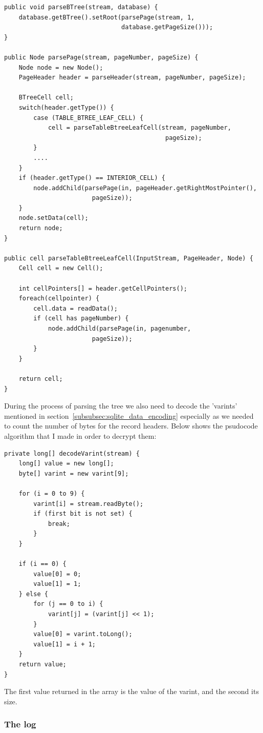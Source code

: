 \begin{lstlisting}	
public void parseBTree(stream, database) {
	database.getBTree().setRoot(parsePage(stream, 1, 
								database.getPageSize()));
}

public Node parsePage(stream, pageNumber, pageSize) {
	Node node = new Node();
	PageHeader header = parseHeader(stream, pageNumber, pageSize);
	
	BTreeCell cell;
	switch(header.getType()) {
		case (TABLE_BTREE_LEAF_CELL) {
			cell = parseTableBtreeLeafCell(stream, pageNumber, 
											pageSize);
		}
		....
	}
	if (header.getType() == INTERIOR_CELL) {
		node.addChild(parsePage(in, pageHeader.getRightMostPointer(), 
						pageSize));
	}
	node.setData(cell);
	return node;
}

public cell parseTableBtreeLeafCell(InputStream, PageHeader, Node) {
	Cell cell = new Cell();
	
	int cellPointers[] = header.getCellPointers();
	foreach(cellpointer) {
		cell.data = readData();		
		if (cell has pageNumber) {
			node.addChild(parsePage(in, pagenumber, 
						pageSize));
		}
	}
	
	return cell;
}
\end{lstlisting}

During the process of parsing the tree we also need to decode the 'varints' mentioned in section~\ref{subsubsec:sqlite_data_encoding} especially as we needed to count the number of bytes for the record headers. Below shows the psudocode algorithm that I made in order to decrypt them: 

\begin{lstlisting}	
private long[] decodeVarint(stream) {
	long[] value = new long[];
	byte[] varint = new varint[9];
	
	for (i = 0 to 9) {
		varint[i] = stream.readByte();
		if (first bit is not set) {
			break;
		}
	}
	
	if (i == 0) {
		value[0] = 0;
		value[1] = 1;
	} else {
		for (j == 0 to i) {
			varint[j] = (varint[j] << 1);
		}
		value[0] = varint.toLong();
		value[1] = i + 1;
	}
	return value;
}
\end{lstlisting}

The first value returned in the array is the value of the varint, and the second its size. 

\subsubsection{The log}
\label{subsubsec:log_imp}


